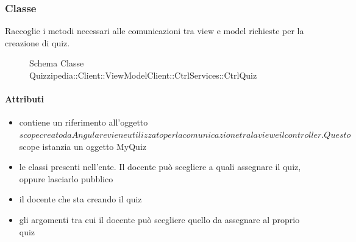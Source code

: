\subsubsection{Classe }
Raccoglie i metodi necessari alle comunicazioni tra view e model richieste per la creazione di quiz.
\begin{figure}[H]
\centering
\noindent{}
\caption[Schema Classe CtrlQuiz]{Schema Classe Quizzipedia::Client::ViewModelClient::CtrlServices::CtrlQuiz}
\end{figure}
\paragraph{Attributi}
\begin{itemize}
\item {}
\newline
contiene un riferimento all'oggetto $scope creato da Angular e viene utilizzato per la comunicazione tra la view e il controller. Questo $scope istanzia un oggetto MyQuiz
\item {}
\newline
le classi presenti nell'ente. Il docente può scegliere a quali assegnare il quiz, oppure lasciarlo pubblico
\item {}
\newline
il docente che sta creando il quiz
\item {}
\newline
gli argomenti tra cui il docente può scegliere quello da assegnare al proprio quiz
\end{itemize}
